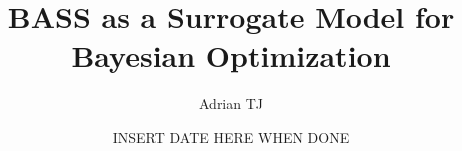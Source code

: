 \documentclass[a4paper,12pt]{book}
\begin{document}
	
\newtheorem{definition}{Definition}
\newtheorem{theorem}{Theorem}
\newtheorem{lemma}{Lemma}

\author{Adrian TJ}
\title{BASS as a Surrogate Model for Bayesian Optimization}
\date{INSERT DATE HERE WHEN DONE}

\frontmatter
\maketitle
\tableofcontents

\mainmatter








\backmatter

\nocite{*}

\end{document}

